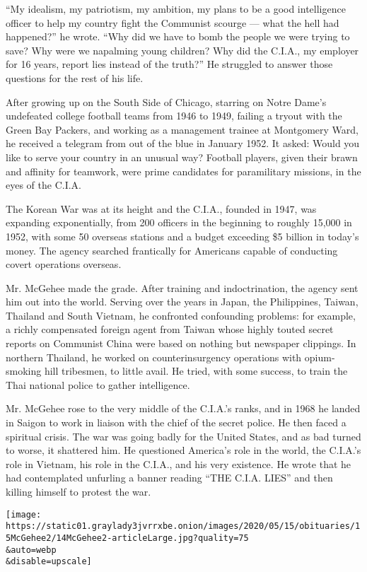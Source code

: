 ``My idealism, my patriotism, my ambition, my plans to be a good
intelligence officer to help my country fight the Communist scourge ---
what the hell had happened?'' he wrote. ``Why did we have to bomb the
people we were trying to save? Why were we napalming young children? Why
did the C.I.A., my employer for 16 years, report lies instead of the
truth?'' He struggled to answer those questions for the rest of his
life.

After growing up on the South Side of Chicago, starring on Notre Dame's
undefeated college football teams from 1946 to 1949, failing a tryout
with the Green Bay Packers, and working as a management trainee at
Montgomery Ward, he received a telegram from out of the blue in January
1952. It asked: Would you like to serve your country in an unusual way?
Football players, given their brawn and affinity for teamwork, were
prime candidates for paramilitary missions, in the eyes of the C.I.A.

The Korean War was at its height and the C.I.A., founded in 1947, was
expanding exponentially, from 200 officers in the beginning to roughly
15,000 in 1952, with some 50 overseas stations and a budget exceeding
\$5 billion in today's money. The agency searched frantically for
Americans capable of conducting covert operations overseas.

Mr. McGehee made the grade. After training and indoctrination, the
agency sent him out into the world. Serving over the years in Japan, the
Philippines, Taiwan, Thailand and South Vietnam, he confronted
confounding problems: for example, a richly compensated foreign agent
from Taiwan whose highly touted secret reports on Communist China were
based on nothing but newspaper clippings. In northern Thailand, he
worked on counterinsurgency operations with opium-smoking hill
tribesmen, to little avail. He tried, with some success, to train the
Thai national police to gather intelligence.

Mr. McGehee rose to the very middle of the C.I.A.'s ranks, and in 1968
he landed in Saigon to work in liaison with the chief of the secret
police. He then faced a spiritual crisis. The war was going badly for
the United States, and as bad turned to worse, it shattered him. He
questioned America's role in the world, the C.I.A.'s role in Vietnam,
his role in the C.I.A., and his very existence. He wrote that he had
contemplated unfurling a banner reading ``THE C.I.A. LIES'' and then
killing himself to protest the war.

\texttt{[image: https://static01.graylady3jvrrxbe.onion/images/2020/05/15/obituaries/15McGehee2/14McGehee2-articleLarge.jpg?quality=75\\\&auto=webp\\\&disable=upscale]}

